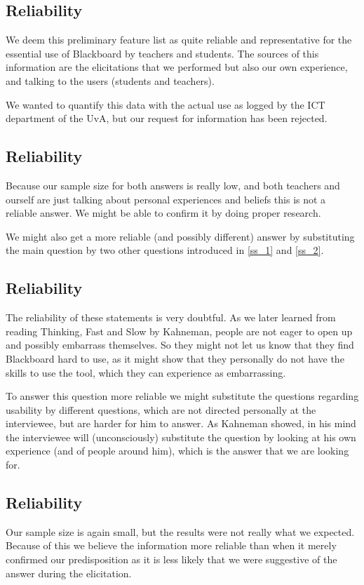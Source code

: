 \subsection{Reliability}
We deem this preliminary feature list as quite reliable and representative for the essential use of Blackboard by teachers and students. The sources of this information are the elicitations that we performed but also our own experience, and talking to the users (students and teachers).

We wanted to quantify this data with the actual use as logged by the ICT department of the UvA, but our request for information has been rejected.

\subsection{Reliability}
Because our sample size for both answers is really low, and both teachers and ourself are just talking about personal experiences and beliefs this is not a reliable answer. We might be able to confirm it by doing proper research.

We might also get a more reliable (and possibly different) answer by substituting the main question by two other questions introduced in \ref{ss_1} and \ref{ss_2}.

\subsection{Reliability}
The reliability of these statements is very doubtful. As we later learned from reading Thinking, Fast and Slow by Kahneman, people are not eager to open up and possibly embarrass themselves. So they might not let us know that they find Blackboard hard to use, as it might show that they personally do not have the skills to use the tool, which they can experience as embarrassing.

To answer this question more reliable we might substitute the questions regarding usability by different questions, which are not directed personally at the interviewee, but are harder for him to answer. As Kahneman showed, in his mind the interviewee will (unconsciously) substitute the question by looking at his own experience (and of people around him), which is the answer that we are looking for. 


\subsection{Reliability}
Our sample size is again small, but the results were not really what we expected. Because of this we believe the information more reliable than when it merely confirmed our predisposition as it is less likely that we were suggestive of the answer during the elicitation.

